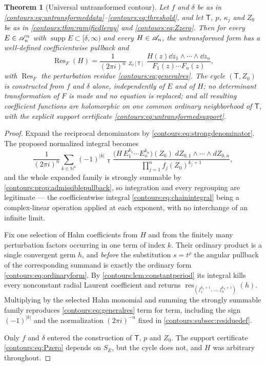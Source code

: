 \documentclass[11pt,letterpaper]{article}
\newtheorem{theorem}{Theorem}[section]
\theoremstyle{definition}
\theoremstyle{remark}
\newcommand{\N}{\mathbb N}\newcommand{\Z}{\mathbb Z}\newcommand{\DD}{\mathbb D}
\newcommand{\supp}{\operatorname{supp}}\newcommand{\Res}{\operatorname{Res}}
\newcommand{\res}{\operatorname{res}}\newcommand{\wind}{\operatorname{wind}}
\newcommand{\HInt}{\mathop{\int^{\!H}}\nolimits}
\numberwithin{equation}{section}
\begin{document}
\begin{theorem}[Universal untransformed contour]
\label{contours:thm:untransformed}
Let $f$ and $\delta$ be as in
\eqref{contours:eq:untransformeddata}--\eqref{contours:eq:threshold}, and let
$\mathsf T$, $p$, $\kappa_j$ and $Z_0$ be as in
\cref{contours:thm:ramifiedleray} and \eqref{contours:eq:Zzero}. Then for
\emph{every} $E\in\mathscr A_n^n$ with $\supp E\subset[\delta,\infty)$ and \emph{every}
$H\in\mathscr A_n$, the untransformed form has a well-defined coefficientwise pullback
and
\begin{equation}\label{contours:eq:untransformed}
 \boxed{\qquad
 \Res_F(H)=\frac1{(2\pi i)^n}
 \HInt_{Z_0[\mathsf T]}
 \frac{H(z)\dd z_1\wedge\cdots\wedge \dd z_n}{F_1(z)\cdots F_n(z)} ,
 \qquad}
\end{equation}
with $\Res_F$ the perturbation residue \eqref{contours:eq:generalres}. The cycle
$(\mathsf T,Z_0)$ is constructed from $f$ and $\delta$ alone, independently of
$E$ and of $H$; no determinant transformation of $F$ is made and no equation is
replaced; and all resulting coefficient functions are holomorphic on one common
ordinary neighborhood of $\mathsf T$, with the explicit support certificate
\eqref{contours:eq:untransformedsupport}.
\end{theorem}
\begin{proof}
Expand the reciprocal denominators by
\eqref{contours:eq:strongdenominator}. The proposed normalized integral becomes
\begin{equation}\label{contours:eq:expandedintegral}
  \frac1{(2\pi i)^n}\sum_{k\in\N^n}(-1)^{|k|}
  \HInt_{\mathsf T}
  \frac{\bigl(H\,E_1^{k_1}\cdots E_n^{k_n}\bigr)(Z_0)\;
    dZ_{0,1}\wedge\cdots\wedge dZ_{0,n}}
  {\prod_{j=1}^nf_j(Z_0)^{k_j+1}} ,
\end{equation}
and the whole expanded family is strongly summable by
\cref{contours:prop:admissiblepullback}, so integration and every regrouping are
legitimate --- the coefficientwise integral \eqref{contours:eq:chainintegral}
being a complex-linear operation applied at each exponent, with no interchange of
an infinite limit.

Fix one selection of Hahn coefficients from $H$ and from the finitely many
perturbation factors occurring in one term of index $k$. Their ordinary product
is a single convergent germ $h$, and \emph{before} the substitution $s=t^\rho$
the angular pullback of the corresponding summand is exactly the ordinary form
\eqref{contours:eq:ordinaryform}. By \cref{contours:lem:constantperiod} its
integral kills every nonconstant radial Laurent coefficient and returns
$\res_{(f_1^{k_1+1},\ldots,f_n^{k_n+1})}(h)$. Multiplying by the selected Hahn
monomial and summing the strongly summable family reproduces
\eqref{contours:eq:generalres} term for term, including the sign $(-1)^{|k|}$
and the normalization $(2\pi i)^{-n}$ fixed in
\cref{contours:subsec:residuedef}.

Only $f$ and $\delta$ entered the construction of $\mathsf T$, $p$ and $Z_0$.
The support certificate \eqref{contours:eq:Pzero} depends on $S_E$, but the cycle
does not, and $H$ was arbitrary throughout.
\end{proof}
\end{document}
